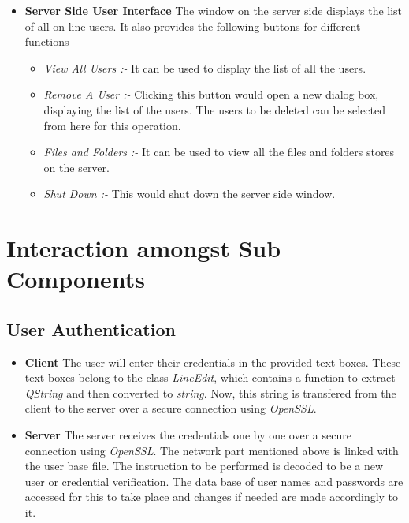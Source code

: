 \documentclass{article}
\begin{document}
\begin{itemize}
					\item \textbf{Server Side User Interface}
					\newline
					The window on the server side displays the list of all on-line users. It also provides the following buttons for different functions
					\begin{itemize}
						\item \textit{View All Users :-} It can be used to display the list of all the users.
						\item \textit{Remove A User :-} Clicking this button would open a new dialog box, displaying the list of the users. The users to be deleted can be selected from here for this operation.
						\item \textit{Files and Folders :-} It can be used to view all the files and folders stores on the server.
						\item \textit{Shut Down :-} This would shut down the server side window.
					\end{itemize}
				\end{itemize}

	\section{Interaction amongst Sub Components}
			\subsection{User Authentication}
				\begin{itemize}
					\item \textbf{Client}
						\newline
						The user will enter their credentials in the provided text boxes. These text boxes belong to the class \textit{LineEdit}, which contains a function to extract \textit{QString} and then converted to \textit{string}. Now, this string is transfered from the client to the server over a secure connection using \textit{OpenSSL}.  
					\item \textbf{Server}
						\newline
						The server receives the credentials one by one over a secure connection using \textit{OpenSSL}. The network part mentioned above is linked with the user base file. The instruction to be performed is decoded to be a new user or credential verification. The data base of user names and passwords are accessed for this to take place and changes if needed are made accordingly to it.
				\end{itemize}
\end{document}
